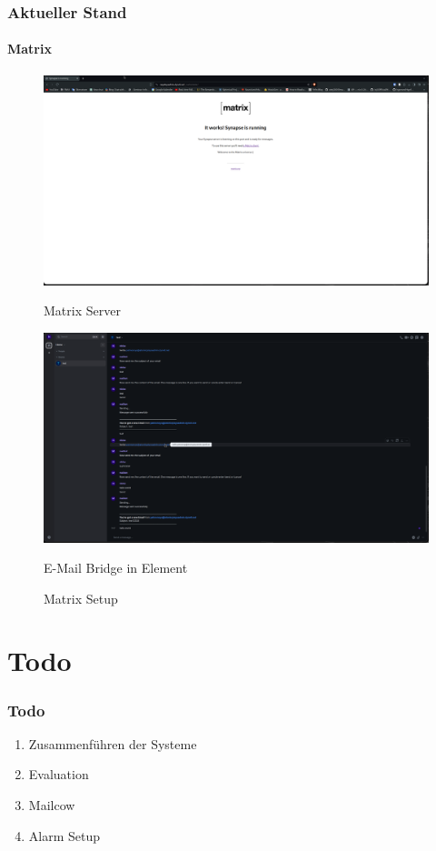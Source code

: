 \documentclass[]{beamer}
\begin{document}
\begin{frame}
	\frametitle{Aktueller Stand}
	\framesubtitle{Matrix}
 \begin{figure}
	\centering
	\begin{minipage}[t]{0.45\textwidth} 
		\centering
		\includegraphics[width=\textwidth]{Images/Matrix 2.png} 
		\caption*{Matrix Server}
	\end{minipage}
	\hfill
	\begin{minipage}[t]{0.45\textwidth} 
		\centering
		\includegraphics[width=\textwidth]{Images/Matrix.png} 
		\caption*{E-Mail Bridge in Element}
	\end{minipage}
	\hfill
	\caption{Matrix Setup}
	\label{fig:Matrix}
\end{figure} 
\end{frame}


\section{Todo}
\begin{frame}
\frametitle{Todo}
\begin{enumerate}
    \item Zusammenführen der Systeme
    \item Evaluation
    \item Mailcow
    \item Alarm Setup
\end{enumerate}
\end{frame}
\end{document}
